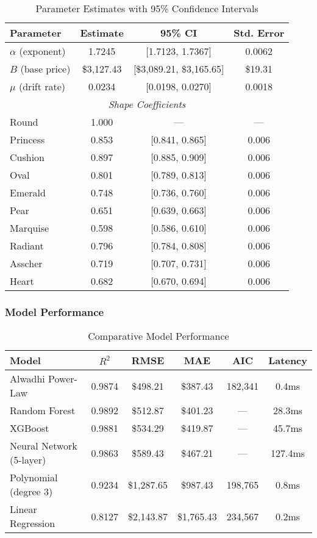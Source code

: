 \documentclass[12pt,a4paper]{article}
\theoremstyle{definition}
\theoremstyle{remark}
\begin{document}
\begin{table}[H]
\centering
\caption{Parameter Estimates with 95\% Confidence Intervals}
\label{tab:parameters}
\begin{tabular}{@{}lccc@{}}
\toprule
\textbf{Parameter} & \textbf{Estimate} & \textbf{95\% CI} & \textbf{Std. Error} \\
\midrule
$\alpha$ (exponent) & 1.7245 & [1.7123, 1.7367] & 0.0062 \\
$B$ (base price) & \$3,127.43 & [\$3,089.21, \$3,165.65] & \$19.31 \\
$\mu$ (drift rate) & 0.0234 & [0.0198, 0.0270] & 0.0018 \\
\midrule
\multicolumn{4}{c}{\textit{Shape Coefficients}} \\
\midrule
Round & 1.000 & --- & --- \\
Princess & 0.853 & [0.841, 0.865] & 0.006 \\
Cushion & 0.897 & [0.885, 0.909] & 0.006 \\
Oval & 0.801 & [0.789, 0.813] & 0.006 \\
Emerald & 0.748 & [0.736, 0.760] & 0.006 \\
Pear & 0.651 & [0.639, 0.663] & 0.006 \\
Marquise & 0.598 & [0.586, 0.610] & 0.006 \\
Radiant & 0.796 & [0.784, 0.808] & 0.006 \\
Asscher & 0.719 & [0.707, 0.731] & 0.006 \\
Heart & 0.682 & [0.670, 0.694] & 0.006 \\
\bottomrule
\end{tabular}
\end{table}

\subsubsection{Model Performance}

\begin{table}[H]
\centering
\caption{Comparative Model Performance}
\label{tab:comparison}
\begin{tabular}{@{}lccccc@{}}
\toprule
\textbf{Model} & \textbf{$R^2$} & \textbf{RMSE} & \textbf{MAE} & \textbf{AIC} & \textbf{Latency} \\
\midrule
Alwadhi Power-Law & 0.9874 & \$498.21 & \$387.43 & 182,341 & 0.4ms \\
Random Forest & 0.9892 & \$512.87 & \$401.23 & --- & 28.3ms \\
XGBoost & 0.9881 & \$534.29 & \$419.87 & --- & 45.7ms \\
Neural Network (5-layer) & 0.9863 & \$589.43 & \$467.21 & --- & 127.4ms \\
Polynomial (degree 3) & 0.9234 & \$1,287.65 & \$987.43 & 198,765 & 0.8ms \\
Linear Regression & 0.8127 & \$2,143.87 & \$1,765.43 & 234,567 & 0.2ms \\
\bottomrule
\end{tabular}
\end{table}
\end{document}
